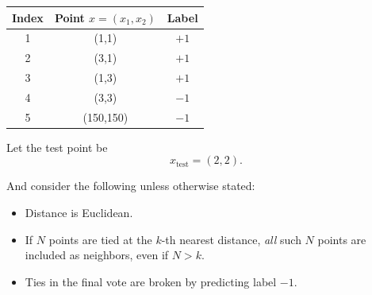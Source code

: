 \documentclass{article}
\begin{document}
\begin{center}
\begin{tabular}{c c c}
\hline
Index & Point \(x = (x_1, x_2)\) & Label \\
\hline
1 & (1,1) & \(+1\) \\
2 & (3,1) & \(+1\) \\
3 & (1,3) & \(+1\) \\
4 & (3,3) & \(-1\) \\
5 & (150,150) & \(-1\) \\
\hline
\end{tabular}
\end{center}

Let the test point be
\[
x_{\text{test}} = (2,2).
\]

And consider the following unless otherwise stated:
\begin{itemize}
    \item Distance is Euclidean.
    \item If $N$ points are tied at the \(k\)-th nearest distance, \emph{all} such $N$ points are included as neighbors, even if $N > k$.
    \item Ties in the final vote are broken by predicting label \(-1\).
\end{itemize}
\end{document}

